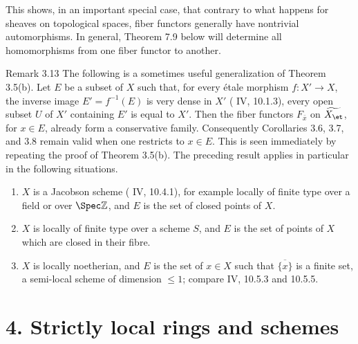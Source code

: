 This shows, in an important special case, that contrary to what happens for sheaves on topological spaces, fiber functors generally have nontrivial automorphisms. In general, Theorem 7.9 below will determine all homomorphisms from one fiber functor to another.

\begin{remarktext}{Remark 3.13}
The following is a sometimes useful generalization of Theorem 3.5(b). Let \(E\) be a subset of \(X\) such that, for every \'etale morphism \(f:X'\to X\), the inverse image \(E'=f^{-1}(E)\) is very dense in \(X'\) (\EGA{} IV, 10.1.3), \ie every open subset \(U\) of \(X'\) containing \(E'\) is equal to \(X'\). Then the fiber functors \(F_{\bar x}\) on \(\widetilde{X_{\et}}\), for \(x\in E\), already form a conservative family. Consequently Corollaries 3.6, 3.7, and 3.8 remain valid when one restricts to \(x\in E\). This is seen immediately by repeating the proof of Theorem 3.5(b). The preceding result applies in particular in the following situations.
\begin{enumerate}[label=\alph*)]
\item \(X\) is a Jacobson scheme (\EGA{} IV, 10.4.1), for example locally of finite type over a field or over \(\Spec\mathbb Z\), and \(E\) is the set of closed points of \(X\).
\item \(X\) is locally of finite type over a scheme \(S\), and \(E\) is the set of points of \(X\) which are closed in their fibre.
\item \(X\) is locally noetherian, and \(E\) is the set of \(x\in X\) such that \(\overline{\{x\}}\) is a finite set, \ie a semi-local scheme of dimension \(\leq 1\); compare \EGA{} IV, 10.5.3 and 10.5.5.
\end{enumerate}
\end{remarktext}

\section*{4. Strictly local rings and schemes}

